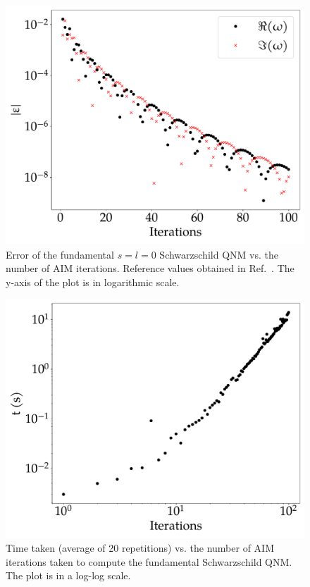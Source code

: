 \begin{figure}[!ht]
  \centering
  \includegraphics[scale = 0.35]{img/aim_qnm/err.pdf}
  \caption{Error of the fundamental $s=l=0$ Schwarzschild QNM vs. the number of AIM iterations. Reference values obtained in Ref.~\cite{BertiQNMData}. The y-axis of the plot is in logarithmic scale.}
  \label{fig:package_error}
\end{figure}

\begin{figure}[!ht]
  \centering
  \includegraphics[scale = 0.35]{img/aim_qnm/perf.pdf}
  \caption{Time taken (average of 20 repetitions) vs. the number of AIM iterations taken to compute the fundamental Schwarzschild QNM. The plot is in a log-log scale.}
  \label{fig:package_perf}
\end{figure}

